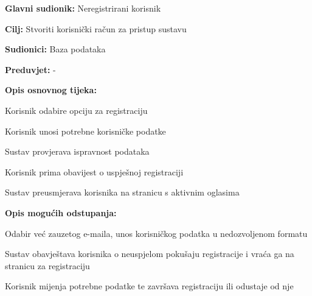 					\noindent {}
					\begin{packed_item}
	
						\item \textbf{Glavni sudionik: }Neregistrirani korisnik
						\item  \textbf{Cilj: }Stvoriti korisnički račun za pristup sustavu
						\item  \textbf{Sudionici: }Baza podataka
						\item  \textbf{Preduvjet: }-
						\item  \textbf{Opis osnovnog tijeka:}
						
						\item[] \begin{packed_enum}
	
							\item Korisnik odabire opciju za registraciju
							\item Korisnik unosi potrebne korisničke podatke
							\item Sustav provjerava ispravnost podataka
							\item Korisnik prima obavijest o uspješnoj registraciji
							\item Sustav preusmjerava korisnika na stranicu s aktivnim oglasima

						\end{packed_enum}
						
						\item  \textbf{Opis mogućih odstupanja:}
						
						\item[] \begin{packed_item}
	
							\item[2.a] Odabir već zauzetog e-maila, unos korisničkog podatka u nedozvoljenom formatu
							\item[] \begin{packed_enum}
								
								\item Sustav obavještava korisnika o neuspjelom pokušaju registracije i vraća ga na stranicu za registraciju
								\item Korisnik mijenja potrebne podatke te završava registraciju ili odustaje od nje
								
							\end{packed_enum}
							
						\end{packed_item}						
					\end{packed_item}



